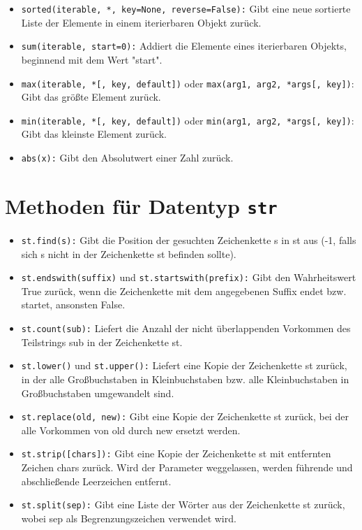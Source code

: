 \documentclass[11pt, oneside]{book}
\begin{document}
\begin{itemize}
    \item \texttt{sorted(iterable, *, key=None, reverse=False):} Gibt eine neue sortierte Liste der Elemente in einem iterierbaren Objekt zurück.
    
    \item \texttt{sum(iterable, start=0):} Addiert die Elemente eines iterierbaren Objekts, beginnend mit dem Wert "start".
    
    \item \texttt{max(iterable, *[, key, default])} oder \texttt{max(arg1, arg2, *args[, key])}: Gibt das größte Element zurück.
    
    \item \texttt{min(iterable, *[, key, default])} oder \texttt{min(arg1, arg2, *args[, key])}: Gibt das kleinste Element zurück.
    
    \item \texttt{abs(x):} Gibt den Absolutwert einer Zahl zurück.

\end{itemize}


\section{Methoden für Datentyp \texttt{str}}

\begin{itemize}
    \item \texttt{st.find(s):} Gibt die Position der gesuchten Zeichenkette s in st aus (-1, falls sich s nicht in der Zeichenkette st befinden sollte).
    
    \item \texttt{st.endswith(suffix)} und \texttt{st.startswith(prefix):} Gibt den Wahrheitswert True zurück, wenn die Zeichenkette mit dem angegebenen Suffix endet bzw. startet, ansonsten False.
    
    \item \texttt{st.count(sub):} Liefert die Anzahl der nicht überlappenden Vorkommen des Teilstrings sub in der Zeichenkette st.
    
    \item \texttt{st.lower()} und \texttt{st.upper():} Liefert eine Kopie der Zeichenkette st zurück, in der alle Großbuchstaben in Kleinbuchstaben bzw. alle Kleinbuchstaben in Großbuchstaben umgewandelt sind.
    
    \item \texttt{st.replace(old, new):} Gibt eine Kopie der Zeichenkette st zurück, bei der alle Vorkommen von old durch new ersetzt werden.
    
    \item \texttt{st.strip([chars]):} Gibt eine Kopie der Zeichenkette st mit entfernten Zeichen chars zurück. Wird der Parameter weggelassen, werden führende und abschließende Leerzeichen entfernt.
    
    \item \texttt{st.split(sep):} Gibt eine Liste der Wörter aus der Zeichenkette st zurück, wobei sep als Begrenzungszeichen verwendet wird.
\end{itemize}
\end{document}
